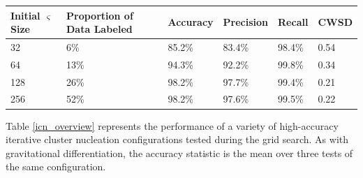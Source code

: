 \documentclass[10pt]{article}
\begin{document}
\begin{minipage}{\textwidth}
    \begin{center}
         \label{icn_accuracy_by_varsigma}
        \begin{tabular}{|l|l|l|l|l|l|}
            \hline
            Initial $\varsigma$ Size & Proportion of Data Labeled & Accuracy & Precision & Recall & CWSD \\
            \hline
            32 & 6\% & 85.2\% & 83.4\% & 98.4\% & 0.54 \\
            \hline
            64 & 13\% & 94.3\% & 92.2\% & 99.8\% & 0.34 \\
            \hline
            128 & 26\% & 98.2\% & 97.7\% & 99.4\% & 0.21 \\
            \hline
            256 & 52\% & 98.2\% & 97.6\% & 99.5\% & 0.22 \\
            \hline
        \end{tabular}
    \end{center}
\end{minipage}

Table \ref{icn_overview} represents the performance of a variety of high-accuracy iterative cluster nucleation configurations tested during the grid search. As with gravitational differentiation, the accuracy statistic is the mean over three tests of the same configuration.
\end{document}
